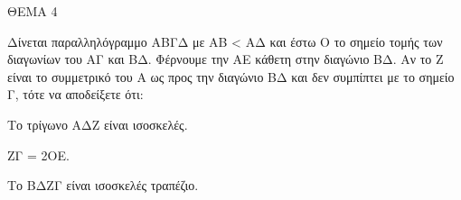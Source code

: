 
ΘΕΜΑ 4

Δίνεται παραλληλόγραμμο ΑΒΓΔ με ΑΒ \textless{} ΑΔ και έστω Ο το σημείο τομής των διαγωνίων του ΑΓ και ΒΔ. Φέρνουμε την ΑΕ κάθετη στην διαγώνιο ΒΔ. Αν το Ζ είναι το συμμετρικό του Α ως προς την διαγώνιο ΒΔ και δεν συμπίπτει με το σημείο Γ, τότε να αποδείξετε ότι:

\begin{alist}
\item Το τρίγωνο ΑΔΖ είναι ισοσκελές. 

\item ΖΓ = 2ΟΕ. 

\item Το ΒΔΖΓ είναι ισοσκελές τραπέζιο. 


\end{alist}
